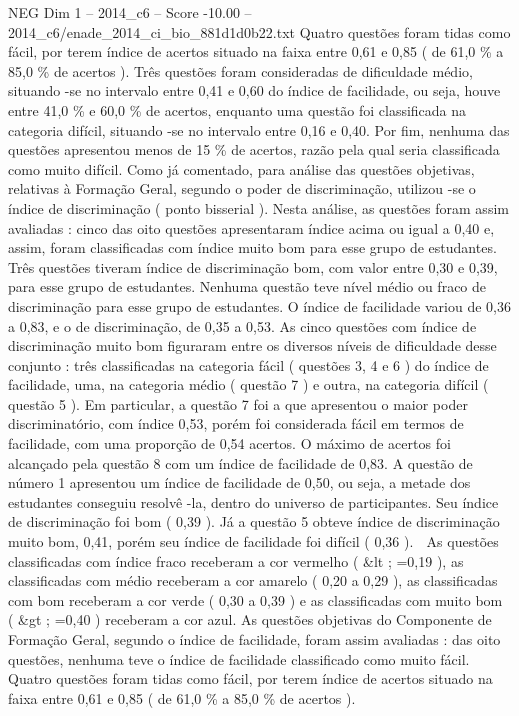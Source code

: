 \begin{textsample}{NEG Dim 1 – 2014\_c6 – Score -10.00 – 2014\_c6/enade\_2014\_ci\_bio\_881d1d0b22.txt}
Quatro questões foram tidas como fácil, por terem índice de acertos situado na faixa entre 0,61 e 0,85 ( de 61,0 \% a 85,0 \% de acertos ).
Três questões foram consideradas de dificuldade médio, situando -se no intervalo entre 0,41 e 0,60 do índice de facilidade, ou seja, houve entre 41,0 \% e 60,0 \% de acertos, enquanto uma questão foi classificada na categoria difícil, situando -se no intervalo entre 0,16 e 0,40.
Por fim, nenhuma das questões apresentou menos de 15 \% de acertos, razão pela qual seria classificada como muito difícil.
Como já comentado, para análise das questões objetivas, relativas à Formação Geral, segundo o poder de discriminação, utilizou -se o índice de discriminação ( ponto bisserial ).
Nesta análise, as questões foram assim avaliadas : cinco das oito questões apresentaram índice acima ou igual a 0,40 e, assim, foram classificadas com índice muito bom para esse grupo de estudantes.
Três questões tiveram índice de discriminação bom, com valor entre 0,30 e 0,39, para esse grupo de estudantes.
Nenhuma questão teve nível médio ou fraco de discriminação para esse grupo de estudantes.
O índice de facilidade variou de 0,36 a 0,83, e o de discriminação, de 0,35 a 0,53.
As cinco questões com índice de discriminação muito bom figuraram entre os diversos níveis de dificuldade desse conjunto : três classificadas na categoria fácil ( questões 3, 4 e 6 ) do índice de facilidade, uma, na categoria médio ( questão 7 ) e outra, na categoria difícil ( questão 5 ).
Em particular, a questão 7 foi a que apresentou o maior poder discriminatório, com índice 0,53, porém foi considerada fácil em termos de facilidade, com uma proporção de 0,54 acertos.
O máximo de acertos foi alcançado pela questão 8 com um índice de facilidade de 0,83.
A questão de número 1 apresentou um índice de facilidade de 0,50, ou seja, a metade dos estudantes conseguiu resolvê -la, dentro do universo de participantes.
Seu índice de discriminação foi bom ( 0,39 ).
Já a questão 5 obteve índice de discriminação muito bom, 0,41, porém seu índice de facilidade foi difícil ( 0,36 ).  As questões classificadas com índice fraco receberam a cor vermelho ( \&lt ; =0,19 ), as classificadas com médio receberam a cor amarelo ( 0,20 a 0,29 ), as classificadas com bom receberam a cor verde ( 0,30 a 0,39 ) e as classificadas com muito bom ( \&gt ; =0,40 ) receberam a cor azul.
As questões objetivas do Componente de Formação Geral, segundo o índice de facilidade, foram assim avaliadas : das oito questões, nenhuma teve o índice de facilidade classificado como muito fácil.
Quatro questões foram tidas como fácil, por terem índice de acertos situado na faixa entre 0,61 e 0,85 ( de 61,0 \% a 85,0 \% de acertos ).

\end{textsample}
